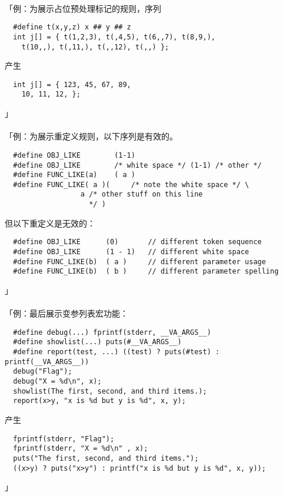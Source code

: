 \paragraph{}
「例：为展示占位预处理标记的规则，序列
\begin{lstlisting}
  #define t(x,y,z) x ## y ## z
  int j[] = { t(1,2,3), t(,4,5), t(6,,7), t(8,9,),
    t(10,,), t(,11,), t(,,12), t(,,) };
\end{lstlisting}
产生
\begin{lstlisting}
  int j[] = { 123, 45, 67, 89,
    10, 11, 12, };
\end{lstlisting}」

\paragraph{}
「例：为展示重定义规则，以下序列是有效的。
\begin{lstlisting}
  #define OBJ_LIKE        (1-1)
  #define OBJ_LIKE        /* white space */ (1-1) /* other */
  #define FUNC_LIKE(a)    ( a )
  #define FUNC_LIKE( a )(     /* note the white space */ \
                  a /* other stuff on this line
                    */ )
\end{lstlisting}
但以下重定义是无效的：
\begin{lstlisting}
  #define OBJ_LIKE      (0)       // different token sequence
  #define OBJ_LIKE      (1 - 1)   // different white space
  #define FUNC_LIKE(b)  ( a )     // different parameter usage
  #define FUNC_LIKE(b)  ( b )     // different parameter spelling
\end{lstlisting}」

\paragraph{}
「例：最后展示变参列表宏功能：
\begin{lstlisting}
  #define debug(...) fprintf(stderr, __VA_ARGS__)
  #define showlist(...) puts(#__VA_ARGS__)
  #define report(test, ...) ((test) ? puts(#test) : printf(__VA_ARGS__))
  debug("Flag");
  debug("X = %d\n", x);
  showlist(The first, second, and third items.);
  report(x>y, "x is %d but y is %d", x, y);
\end{lstlisting}
产生
\begin{lstlisting}
  fprintf(stderr, "Flag");
  fprintf(stderr, "X = %d\n" , x);
  puts("The first, second, and third items.");
  ((x>y) ? puts("x>y") : printf("x is %d but y is %d", x, y));
\end{lstlisting}」


